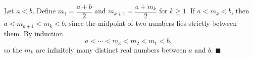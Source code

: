 Let $a<b$. Define $m_1=\dfrac{a+b}{2}$ and $m_{k+1}=\dfrac{a+m_k}{2}$ for $k\ge1$. If $a<m_k<b$, then $a<m_{k+1}<m_k<b$, since the midpoint of two numbers lies strictly between them. By induction
\[a<\cdots<m_3<m_2<m_1<b,\]
so the $m_k$ are infinitely many distinct real numbers between $a$ and $b$. $\blacksquare$
